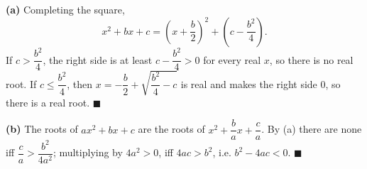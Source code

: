 \textbf{(a)} Completing the square,
\[x^2+bx+c=\left(x+\dfrac b2\right)^2+\left(c-\dfrac{b^2}{4}\right).\]
If $c>\dfrac{b^2}{4}$, the right side is at least $c-\dfrac{b^2}{4}>0$ for every real $x$, so there is no real root. If $c\le\dfrac{b^2}{4}$, then $x=-\dfrac b2+\sqrt{\dfrac{b^2}{4}-c}$ is real and makes the right side $0$, so there is a real root. $\blacksquare$

\textbf{(b)} The roots of $ax^2+bx+c$ are the roots of $x^2+\dfrac bax+\dfrac ca$. By (a) there are none iff $\dfrac ca>\dfrac{b^2}{4a^2}$; multiplying by $4a^2>0$, iff $4ac>b^2$, i.e. $\boxed{b^2-4ac<0}$. $\blacksquare$
